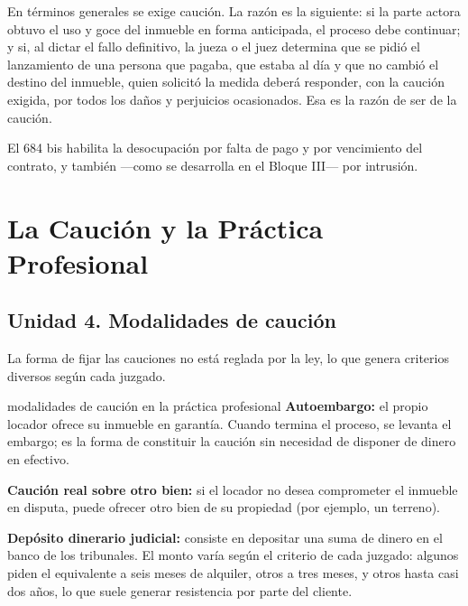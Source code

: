 \documentclass[12pt,oneside]{book}
\begin{document}
En términos generales se exige caución. La razón es la siguiente: si la parte actora obtuvo el uso y goce del inmueble en forma anticipada, el proceso debe continuar; y si, al dictar el fallo definitivo, la jueza o el juez determina que se pidió el lanzamiento de una persona que pagaba, que estaba al día y que no cambió el destino del inmueble, quien solicitó la medida deberá responder, con la caución exigida, por todos los daños y perjuicios ocasionados. Esa es la razón de ser de la caución.

El 684 bis habilita la desocupación por falta de pago y por vencimiento del contrato, y también ---como se desarrolla en el Bloque III--- por intrusión.

\chapter{La Caución y la Práctica Profesional}

\section{Unidad 4. Modalidades de caución}

La forma de fijar las cauciones no está reglada por la ley, lo que genera criterios diversos según cada juzgado.

\begin{example}{modalidades de caución en la práctica profesional}
\textbf{Autoembargo:} el propio locador ofrece su inmueble en garantía. Cuando termina el proceso, se levanta el embargo; es la forma de constituir la caución sin necesidad de disponer de dinero en efectivo.

\textbf{Caución real sobre otro bien:} si el locador no desea comprometer el inmueble en disputa, puede ofrecer otro bien de su propiedad (por ejemplo, un terreno).

\textbf{Depósito dinerario judicial:} consiste en depositar una suma de dinero en el banco de los tribunales. El monto varía según el criterio de cada juzgado: algunos piden el equivalente a seis meses de alquiler, otros a tres meses, y otros hasta casi dos años, lo que suele generar resistencia por parte del cliente.
\end{example}
\end{document}
